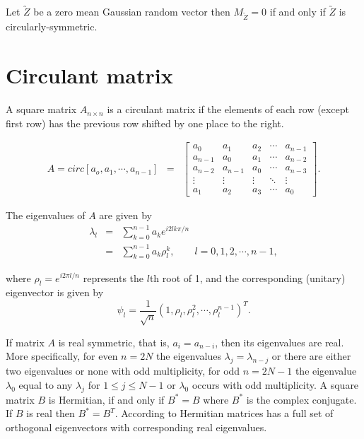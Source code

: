 \begin{theorem}[Gallager, 2008] \label{circular_theory} \hfill \\
	Let $\utilde{Z}$ be a zero mean Gaussian random vector then $M_{\utilde{Z}}=0$ if and only if $\utilde{Z}$ is circularly-symmetric.
\end{theorem}

\vskip 8pt

\section{Circulant matrix} \label{circulant}

A square matrix $A_{n\times n}$ is a circulant matrix if the elements of each row (except first row) has the previous row shifted by one place to the right.

\begin{eqnarray}
	A = circ[a_o, a_1,\cdots,a_{n-1}] &=& \left[
		\begin{array}{lllll}
			a_0     & a_1     & a_2    & \cdots & a_{n-1} \\
			a_{n-1} & a_0     & a_1    & \cdots & a_{n-2} \\
			a_{n-2} & a_{n-1} & a_0    & \cdots & a_{n-3} \\
			\vdots  & \vdots  & \vdots & \ddots & \vdots  \\
			a_1     & a_2     & a_3    & \cdots & a_0
		\end{array}
	\right].
\end{eqnarray}

The eigenvalues of $A$ are given by
\begin{eqnarray*}
	\lambda_l & = & \sum_{k=0}^{n-1} a_k e^{i2lk\pi/n} \\
	& = & \sum_{k=0}^{n-1}a_k \rho_l^k, \quad \quad l = 0, 1, 2, \cdots, n-1,
\end{eqnarray*}

where $\rho_l = e^{i2\pi l/n}$ represents the $l$th root of 1, and the corresponding (unitary) eigenvector is given by
\[
	\psi_l = \frac{1}{\sqrt{n}}(1, \rho_l, \rho_l^2, \cdots, \rho_l^{n-1})^T.
\]

If matrix $A$ is real symmetric, that is, $a_i = a_{n-i}$, then its eigenvalues are real. More specifically, for even $n=2N$ the eigenvalues $\lambda_j = \lambda_{n-j}$ or there are either two eigenvalues or none with odd multiplicity, for odd $n=2N-1$ the eigenvalue $\lambda_0$ equal to any $\lambda_j$ for $1\le j \le N-1$ or $\lambda_0$ occurs with odd multiplicity. A square matrix $B$ is Hermitian, if and only if $B^* = B$ where $B^*$ is the complex conjugate. If $B$ is real then $B^* = B^T$. According to \cite{Tee2005} Hermitian matrices has a full set of orthogonal eigenvectors with corresponding real eigenvalues.



